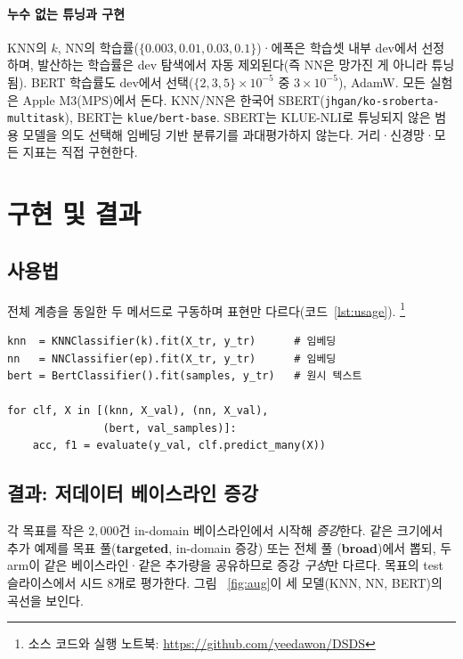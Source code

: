 \documentclass[conference]{IEEEtran}
\begin{document}
\paragraph*{누수 없는 튜닝과 구현}
KNN의 $k$, NN의 학습률($\{0.003,0.01,0.03,0.1\}$)·에폭은 학습셋 내부 dev에서 선정하며, 발산하는 학습률은 dev 탐색에서 자동 제외된다(즉 NN은 망가진 게 아니라 튜닝됨). BERT 학습률도 dev에서 선택($\{2,3,5\}\times10^{-5}$ 중 $3\times10^{-5}$), AdamW. 모든 실험은 Apple
M3(MPS)에서 돈다. KNN/NN은 한국어 SBERT(\texttt{jhgan/ko-sroberta-multitask}),
BERT는 \texttt{klue/bert-base}. SBERT는 KLUE-NLI로 튜닝되지 않은 범용 모델을 의도
선택해 임베딩 기반 분류기를 과대평가하지 않는다. 거리·신경망·모든 지표는 직접
구현한다.

\section{구현 및 결과}
\label{sec:results}
\subsection{사용법}
전체 계층을 동일한 두 메서드로 구동하며 표현만 다르다(코드~\ref{lst:usage}).
\footnote{소스 코드와 실행 노트북: \url{https://github.com/yeedawon/DSDS}}

\begin{lstlisting}[caption={통일된 인터페이스(\texttt{fit}/\texttt{predict\_many})로
세 분류기 구동.}, label={lst:usage}]
knn  = KNNClassifier(k).fit(X_tr, y_tr)      # 임베딩
nn   = NNClassifier(ep).fit(X_tr, y_tr)      # 임베딩
bert = BertClassifier().fit(samples, y_tr)   # 원시 텍스트

for clf, X in [(knn, X_val), (nn, X_val),
               (bert, val_samples)]:
    acc, f1 = evaluate(y_val, clf.predict_many(X))
\end{lstlisting}

\subsection{결과: 저데이터 베이스라인 증강}
\label{sec:pertarget}
각 목표를 작은 $2{,}000$건 in-domain 베이스라인에서 시작해 \emph{증강}한다. 같은
크기에서 추가 예제를 목표 풀(\textbf{targeted}, in-domain 증강) 또는 전체 풀
(\textbf{broad})에서 뽑되, 두 arm이 같은 베이스라인·같은 추가량을 공유하므로 증강
\emph{구성}만 다르다. 목표의 test 슬라이스에서 시드 $8$개로 평가한다. 그림~
\ref{fig:aug}이 세 모델(KNN, NN, BERT)의 곡선을 보인다.
\end{document}
